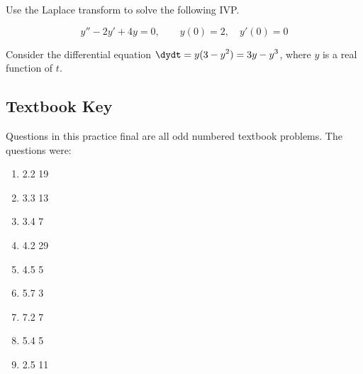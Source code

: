 \documentclass[12pt]{exam}
\begin{document}
\begin{questions}
    \question[10] Use the Laplace transform to solve the following IVP.

    $$\displaystyle y''-2y'+4y=0,\qquad y(0)=2,\quad y'(0)=0$$ %
    
    \question[10] %
    Consider the differential equation $\displaystyle \dydt = y(3-y^2) = 3y - y^3$, where $y$ is a real function of $t$. 
    
\end{questions}

\newpage

\subsection*{Textbook Key}
Questions in this practice final are all odd numbered textbook problems. The questions were:

\begin{enumerate}
    \item 2.2 19
    \item 3.3 13
    \item 3.4 7
    \item 4.2 29
    \item 4.5 5
    \item 5.7 3
    \item 7.2 7
    \item 5.4 5
    \item 2.5 11
\end{enumerate}
\end{document}
